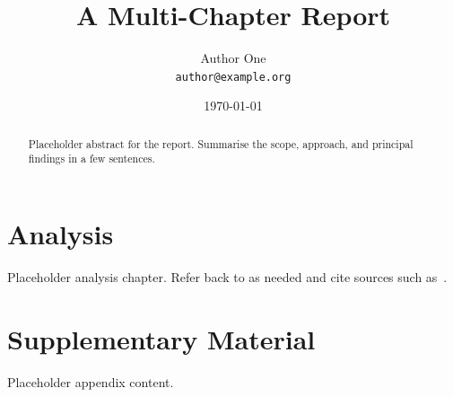 \documentclass[11pt,a4paper]{report}
\title{A Multi-Chapter Report}
\author{Author One\\ \texttt{author@example.org}}
\date{\today}
\begin{document}
\maketitle

\begin{abstract}
Placeholder abstract for the report. Summarise the scope, approach, and
principal findings in a few sentences.
\end{abstract}

\tableofcontents



\chapter{Analysis}
\label{ch:analysis}
Placeholder analysis chapter. Refer back to  as needed and
cite sources such as~\cite{placeholder-report}.

\appendix

\chapter{Supplementary Material}
\label{ch:appendix}
Placeholder appendix content.

\printbibliography[heading=bibintoc]
\end{document}
